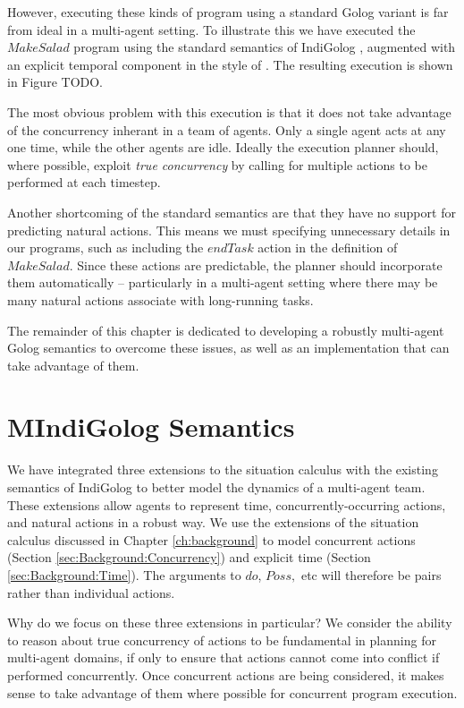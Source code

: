 However, executing these kinds of program using a standard Golog variant
is far from ideal in a multi-agent setting. To illustrate this we
have executed the $MakeSalad$ program using the standard semantics
of IndiGolog \citep{giacomo99indigolog}, augmented with an explicit
temporal component in the style of \citep{Reiter98seq_temp_golog}.
The resulting execution is shown in Figure TODO.

The most obvious problem with this execution is that it does not take
advantage of the concurrency inherant in a team of agents. Only a
single agent acts at any one time, while the other agents are idle.
Ideally the execution planner should, where possible, exploit \emph{true
concurrency} by calling for multiple actions to be performed at each
timestep.

Another shortcoming of the standard semantics are that they have no
support for predicting natural actions. This means we must specifying
unnecessary details in our programs, such as including the $endTask$
action in the definition of $MakeSalad$. Since these actions are
predictable, the planner should incorporate them automatically --
particularly in a multi-agent setting where there may be many natural
actions associate with long-running tasks.

The remainder of this chapter is dedicated to developing a robustly
multi-agent Golog semantics to overcome these issues, as well as an
implementation that can take advantage of them.


\section{MIndiGolog Semantics\label{sec:MIndiGolog:Semantics}}

We have integrated three extensions to the situation calculus with
the existing semantics of IndiGolog to better model the dynamics of
a multi-agent team. These extensions allow agents to represent time,
concurrently-occurring actions, and natural actions in a robust way.
We use the extensions of the situation calculus discussed in Chapter
\ref{ch:background} to model concurrent actions (Section \ref{sec:Background:Concurrency})
and explicit time (Section \ref{sec:Background:Time}). The arguments
to $do$, $Poss,$ etc will therefore be 
pairs rather than individual actions.

Why do we focus on these three extensions in particular? We consider
the ability to reason about true concurrency of actions to be fundamental
in planning for multi-agent domains, if only to ensure that actions
cannot come into conflict if performed concurrently. Once concurrent
actions are being considered, it makes sense to take advantage of
them where possible for concurrent program execution.

